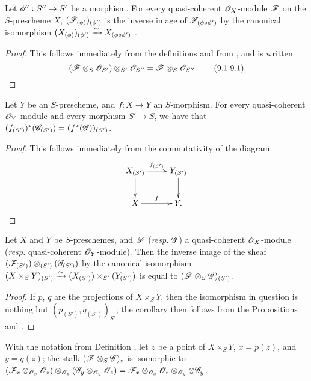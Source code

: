 \begin{prop}[9.1.9]
\label{1.9.1.9}
Let $\vphi'':S''\to S'$ be a morphism.
For every quasi-coherent $\mathscr{O}_X$-module $\mathscr{F}$ on the $S$-prescheme $X$,
$(\mathscr{F}_{(\phi)})_{(\phi')}$ is the inverse image of
$\mathscr{F}_{(\phi\circ\phi')}$ by the canonical isomorphism
$(X_{(\phi)})_{(\phi')}\xrightarrow{\sim} X_{(\phi\circ\phi')}$
.
\end{prop}

\begin{proof}
\label{proof-1.9.1.9}
This follows immediately from the definitions and from , and is
written
\[
  (\mathscr{F}\otimes_S\mathscr{O}_{S'})\otimes_{S'}\mathscr{O}_{S''}=\mathscr{F}\otimes_S\mathscr{O}_{S''}.
  \tag{9.1.9.1}
\]
\end{proof}

\begin{prop}[9.1.10]
\label{1.9.1.10}
Let $Y$ be an $S$-prescheme, and $f:X\to Y$ an $S$-morphism.
For every quasi-coherent $\mathscr{O}_Y$-module and every morphism
$S'\to S$, we have that
$(f_{(S')})^*(\mathscr{G}_{(S')})=(f^*(\mathscr{G}))_{(S')}$.
\end{prop}

\begin{proof}
\label{proof-1.9.1.10}
This follows immediately from the commutativity of the diagram
\[
  \xymatrix{
    X_{(S')}\ar[r]^{f_{(S')}}\ar[d] &
    Y_{(S')}\ar[d]\\
    X\ar[r]^f &
    Y.
  }
\]
\end{proof}

\begin{cor}[9.1.11]
\label{1.9.1.11}
Let $X$ and $Y$ be $S$-preschemes, and
$\mathscr{F}$ (\emph{resp.} $\mathscr{G}$) a quasi-coherent $\mathscr{O}_X$-module
(\emph{resp.} quasi-coherent $\mathscr{O}_Y$-module). Then the inverse image of the sheaf
$(\mathscr{F}_{(S')})\otimes_{(S')}(\mathscr{G}_{(S')})$ by the canonical isomorphism
$(X\times_S Y)_{(S')}\xrightarrow{\sim}(X_{(S')})\times_{S'}(Y_{(S')})$
 is equal to $(\mathscr{F}\otimes_S\mathscr{G})_{(S')}$.
\end{cor}

\begin{proof}
\label{proof-1.9.1.11}
If $p$, $q$ are the projections of $X\times_S Y$, then the isomorphism in question
is nothing but $(p_{(S')}, q_{(S')})_{S'}$; the corollary then follows from the
Propositions  and .
\end{proof}

\begin{prop}[9.1.12]
\label{1.9.1.12}
With the notation from Definition , let $z$ be
a point of $X\times_S Y$, $x=p(z)$, and $y=q(z)$; the stalk
$(\mathscr{F}\otimes_S\mathscr{G})_z$ is isomorphic to
$(\mathscr{F}_x\otimes_{\mathscr{O}_x}\mathscr{O}_z)\otimes_{\mathscr{O}_z}(\mathscr{G}_y\otimes_{\mathscr{O}_y}\mathscr{O}_z)
  =\mathscr{F}_x\otimes_{\mathscr{O}_x}\mathscr{O}_z\otimes_{\mathscr{O}_y}\otimes\mathscr{G}_y$.
\end{prop}

